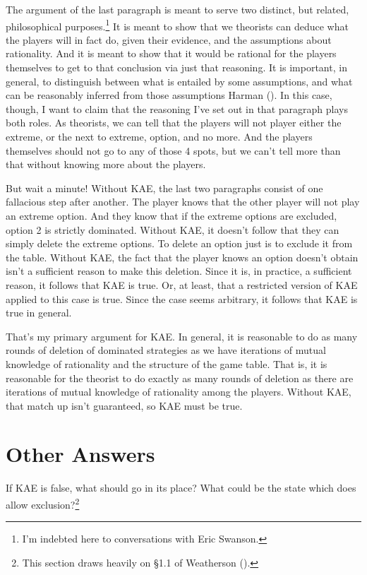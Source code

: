 \documentclass[
  12pt,
  letterpaper,
]{scrbook}
\begin{document}
The argument of the last paragraph is meant to serve two distinct, but
related, philosophical purposes.\footnote{I'm indebted here to
  conversations with Eric Swanson.} It is meant to show that we
theorists can deduce what the players will in fact do, given their
evidence, and the assumptions about rationality. And it is meant to show
that it would be rational for the players themselves to get to that
conclusion via just that reasoning. It is important, in general, to
distinguish between what is entailed by some assumptions, and what can
be reasonably inferred from those assumptions Harman
(). In this case, though, I want to claim
that the reasoning I've set out in that paragraph plays both roles. As
theorists, we can tell that the players will not player either the
extreme, or the next to extreme, option, and no more. And the players
themselves should not go to any of those 4 spots, but we can't tell more
than that without knowing more about the players.

But wait a minute! Without KAE, the last two paragraphs consist of one
fallacious step after another. The player knows that the other player
will not play an extreme option. And they know that if the extreme
options are excluded, option 2 is strictly dominated. Without KAE, it
doesn't follow that they can simply delete the extreme options. To
delete an option just is to exclude it from the table. Without KAE, the
fact that the player knows an option doesn't obtain isn't a sufficient
reason to make this deletion. Since it is, in practice, a sufficient
reason, it follows that KAE is true. Or, at least, that a restricted
version of KAE applied to this case is true. Since the case seems
arbitrary, it follows that KAE is true in general.

That's my primary argument for KAE. In general, it is reasonable to do
as many rounds of deletion of dominated strategies as we have iterations
of mutual knowledge of rationality and the structure of the game table.
That is, it is reasonable for the theorist to do exactly as many rounds
of deletion as there are iterations of mutual knowledge of rationality
among the players. Without KAE, that match up isn't guaranteed, so KAE
must be true.

\section{Other Answers}\label{sec-other-answers}

If KAE is false, what should go in its place? What could be the state
which does allow exclusion?\footnote{This section draws heavily on §1.1
  of Weatherson ().}
\end{document}
